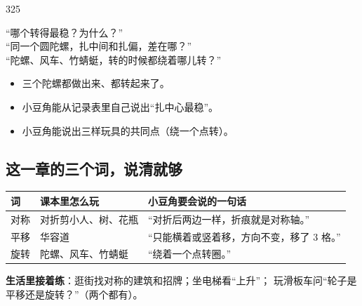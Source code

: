 \begin{lesson}{3}{25}
\begin{saybox}
“哪个转得最稳？为什么？”\\
“同一个圆陀螺，扎中间和扎偏，差在哪？”\\
“陀螺、风车、竹蜻蜓，转的时候都绕着哪儿转？”
\end{saybox}

\begin{passbox}
\begin{itemize}
  \item 三个陀螺都做出来、都转起来了。
  \item 小豆角能从记录表里自己说出“扎中心最稳”。
  \item 小豆角能说出三样玩具的共同点（绕一个点转）。
\end{itemize}
\end{passbox}
\end{lesson}

\subsection{这一章的三个词，说清就够}

\begin{center}
\small
\begin{tabularx}{\linewidth}{@{}p{2.2cm}p{4.4cm}X@{}}
\toprule
\textbf{词} & \textbf{课本里怎么玩} & \textbf{小豆角要会说的一句话} \\
\midrule
对称 & 对折剪小人、树、花瓶 & “对折后两边一样，折痕就是对称轴。” \\
平移 & 华容道 & “只能横着或竖着移，方向不变，移了 3 格。” \\
旋转 & 陀螺、风车、竹蜻蜓 & “绕着一个点转圈。” \\
\bottomrule
\end{tabularx}
\end{center}

\noindent\textbf{生活里接着练}：逛街找对称的建筑和招牌；坐电梯看“上升”；
玩滑板车问“轮子是平移还是旋转？”（两个都有）。
